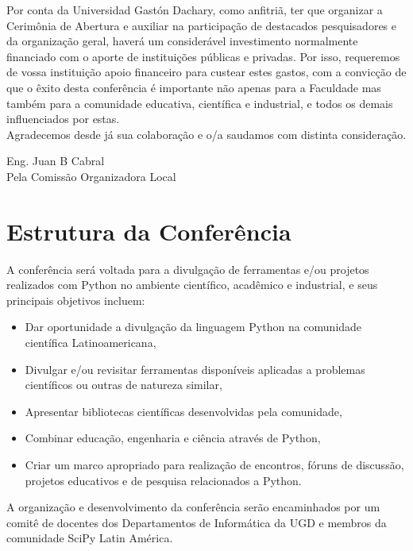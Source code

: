 \documentclass[11pt,a4paper]{report}
\begin{document}
Por conta da Universidad Gastón Dachary, como
anfitriã, ter que organizar a Cerimônia de Abertura e auxiliar
na participação de destacados pesquisadores e da organização geral, haverá um
considerável investimento normalmente financiado com o aporte de
instituições públicas e privadas. Por isso, requeremos de vossa
instituição apoio financeiro para custear estes gastos, com a convicção
de que o êxito desta conferência é importante não apenas para a
Faculdade mas também para a comunidade educativa, científica e industrial, e
todos os demais influenciados por estas.\\[0.1cm]

Agradecemos desde já sua colaboração e o/a saudamos
com distinta consideração.\\[0.1cm]



\begin{flushright}
Eng. Juan B Cabral\\
Pela Comissão Organizadora Local \\

\end{flushright}
\newpage
\section*{Estrutura da Conferência}

    A conferência será voltada para a divulgação de ferramentas e/ou
    projetos realizados com Python no ambiente científico, acadêmico e
    industrial, e seus principais objetivos incluem: 
    
  \begin{itemize}
    \item Dar oportunidade a divulgação da linguagem Python na comunidade científica Latinoamericana,
    \item Divulgar e/ou revisitar ferramentas disponíveis aplicadas a problemas científicos ou outras de natureza similar,
    \item Apresentar bibliotecas científicas desenvolvidas pela comunidade,
    \item Combinar educação, engenharia e ciência através de Python,
    \item Criar um marco apropriado para realização de encontros, fóruns de discussão, projetos educativos e de pesquisa relacionados a Python.
  \end{itemize}
  
A organização e desenvolvimento da conferência serão encaminhados
por um comitê de docentes dos Departamentos de Informática da UGD e
membros da comunidade SciPy Latin América.\\
\end{document}
